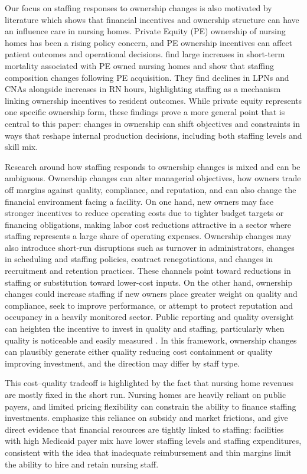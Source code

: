 \documentclass[12pt]{article}
\begin{document}
Our focus on staffing responses to ownership changes is also motivated by literature which shows that financial incentives and ownership structure can have an influence care in nursing homes. Private Equity (PE) ownership of nursing homes has been a rising policy concern, and PE ownership incentives can affect patient outcomes and operational decisions. \cite{gupta_et_al_2021} find large increases in short-term mortality associated with PE owned nursing homes and show that staffing composition changes following PE acquisition. They find declines in LPNs and CNAs alongside increases in RN hours, highlighting staffing as a mechanism linking ownership incentives to resident outcomes. While private equity represents one specific ownership form, these findings prove a more general point that is central to this paper: changes in ownership can shift objectives and constraints in ways that reshape internal production decisions, including both staffing levels and skill mix.

Research around how staffing responds to ownership changes is mixed and can be ambiguous. Ownership changes can alter managerial objectives, how owners trade off margins against quality, compliance, and reputation, and can also change the financial environment facing a facility. On one hand, new owners may face stronger incentives to reduce operating costs due to tighter budget targets or financing obligations, making labor cost reductions attractive in a sector where staffing represents a large share of operating expenses. Ownership changes may also introduce short-run disruptions such as turnover in administrators, changes in scheduling and staffing policies, contract renegotiations, and changes in recruitment and retention practices. These channels point toward reductions in staffing or substitution toward lower-cost inputs. On the other hand, ownership changes could increase staffing if new owners place greater weight on quality and compliance, seek to improve performance, or attempt to protect reputation and occupancy in a heavily monitored sector. Public reporting and quality oversight can heighten the incentive to invest in quality and staffing, particularly when quality is noticeable and easily measured \citep{park_werner_2011}. In this framework, ownership changes can plausibly generate either quality reducing cost containment or quality improving investment, and the direction may differ by staff type.

This cost–quality tradeoff is highlighted by the fact that nursing home revenues are mostly fixed in the short run. Nursing homes are heavily reliant on public payers, and limited pricing flexibility can constrain the ability to finance staffing investments. \cite{gupta_et_al_2021} emphasize this reliance on subsidy and market frictions, and \cite{bowblis_brunt_2025} give direct evidence that financial resources are tightly linked to staffing: facilities with high Medicaid payer mix have lower staffing levels and staffing expenditures, consistent with the idea that inadequate reimbursement and thin margins limit the ability to hire and retain nursing staff. 
\end{document}
